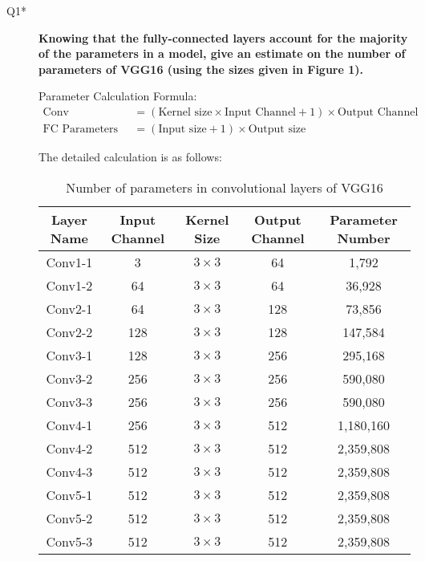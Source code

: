 \documentclass{rapportECL}
\begin{document}
\begin{description}
    \item[Q1*] \textbf{Knowing that the fully-connected layers account for the majority of the parameters in a model, give an estimate on the number of parameters of VGG16 (using the sizes given in Figure 1).}
    
    Parameter Calculation Formula:
    \[
    \begin{aligned}
    \text{Conv Parameters} &= (\text{Kernel size} \times \text{Input Channel} + 1) \times \text{Output Channel} \\
    \text{FC Parameters} &= (\text{Input size} + 1) \times \text{Output size}
    \end{aligned}
    \]
    
    The detailed calculation is as follows:
    
    \begin{table}[h]
    \centering
    \begin{tabular}{|c|c|c|c|c|}
    \hline
    \textbf{Layer Name}  & \textbf{Input Channel} & \textbf{Kernel Size} & \textbf{Output Channel} & \textbf{Parameter Number} \\ \hline
    Conv1-1         & 3         & $3 \times 3$        & 64                  & 1,792            \\ \hline
    Conv1-2         & 64        & $3 \times 3$        & 64                  & 36,928           \\ \hline
    Conv2-1         & 64        & $3 \times 3$        & 128                 & 73,856           \\ \hline
    Conv2-2         & 128       & $3 \times 3$        & 128                 & 147,584          \\ \hline
    Conv3-1         & 128       & $3 \times 3$        & 256                 & 295,168          \\ \hline
    Conv3-2         & 256       & $3 \times 3$        & 256                 & 590,080          \\ \hline
    Conv3-3         & 256       & $3 \times 3$        & 256                 & 590,080          \\ \hline
    Conv4-1         & 256       & $3 \times 3$        & 512                 & 1,180,160        \\ \hline
    Conv4-2         & 512       & $3 \times 3$        & 512                 & 2,359,808        \\ \hline
    Conv4-3         & 512       & $3 \times 3$        & 512                 & 2,359,808        \\ \hline
    Conv5-1         & 512       & $3 \times 3$        & 512                 & 2,359,808        \\ \hline
    Conv5-2         & 512       & $3 \times 3$        & 512                 & 2,359,808        \\ \hline
    Conv5-3         & 512       & $3 \times 3$        & 512                 & 2,359,808        \\ \hline
    \end{tabular}
    \caption{Number of parameters in convolutional layers of VGG16}
    \label{tab:conv_params}
    \end{table}
    

\end{description}
\end{document}
